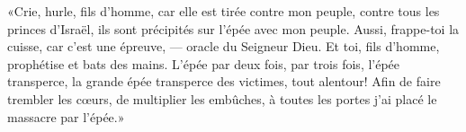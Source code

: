 «Crie, hurle, fils d’homme,
	car elle est tirée contre mon peuple, contre tous les princes d’Israël,
	ils sont précipités sur l’épée avec mon peuple.
Aussi, frappe-toi la cuisse, car c’est une épreuve, --- oracle du Seigneur Dieu.
Et toi, fils d’homme, prophétise et bats des mains.
L’épée par deux fois, par trois fois, l’épée transperce,
	la grande épée transperce des victimes, tout alentour!
Afin de faire trembler les cœurs, de multiplier les embûches,
	à toutes les portes j’ai placé le massacre par l’épée.»
